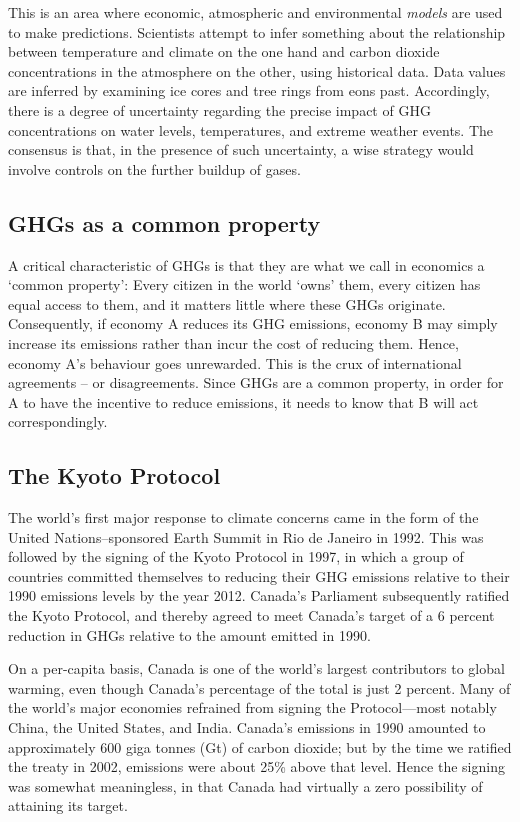 This is an area where economic, atmospheric and environmental \textit{models}
are used to make predictions. Scientists attempt to infer something about
the relationship between temperature and climate on the one hand and carbon
dioxide concentrations in the atmosphere on the other, using historical
data. Data values are inferred by examining ice cores and tree rings from
eons past. Accordingly, there is a degree of uncertainty regarding the
precise impact of GHG concentrations on water levels, temperatures, and
extreme weather events. The consensus is that, in the presence of such
uncertainty, a wise strategy would involve controls on the further buildup
of gases.

\newhtmlpage

\subsection*{GHGs as a common property}

A critical characteristic of GHGs is that they are what we call in economics
a `common property': Every citizen in the world `owns' them, every citizen
has equal access to them, and it matters little where these GHGs originate.
Consequently, if economy A reduces its GHG emissions, economy B may simply
increase its emissions rather than incur the cost of reducing them. Hence,
economy A's behaviour goes unrewarded. This is the crux of international
agreements -- or disagreements. Since GHGs are a common property, in order
for A to have the incentive to reduce emissions, it needs to know that B
will act correspondingly.

\subsection*{The Kyoto Protocol}

The world's first major response to climate concerns came in the form of the
United Nations--sponsored Earth Summit in Rio de Janeiro in 1992. This was
followed by the signing of the Kyoto Protocol in 1997, in which a group of
countries committed themselves to reducing their GHG emissions relative to
their 1990 emissions levels by the year 2012. Canada's Parliament
subsequently ratified the Kyoto Protocol, and thereby agreed to meet
Canada's target of a 6 percent reduction in GHGs relative to the amount
emitted in 1990.

On a per-capita basis, Canada is one of the world's largest contributors to
global warming, even though Canada's percentage of the total is just 2
percent. Many of the world's major economies refrained from signing the
Protocol---most notably China, the United States, and India. Canada's
emissions in 1990 amounted to approximately 600 giga tonnes (Gt) of carbon
dioxide; but by the time we ratified the treaty in 2002, emissions were
about 25\% above that level. Hence the signing was somewhat meaningless, in
that Canada had virtually a zero possibility of attaining its target.

